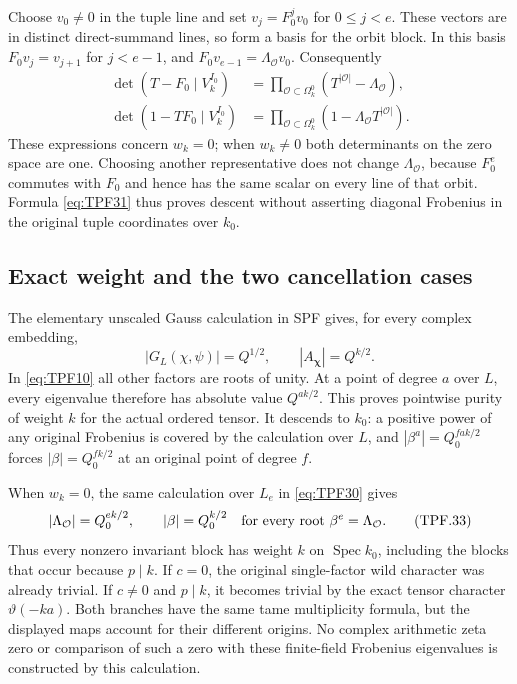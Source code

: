 Choose \(v_0\ne0\) in the tuple line and set
\(v_j=F_0^jv_0\) for \(0\le j<e\).
These vectors are in distinct direct-summand lines,
so form a basis for the orbit block. In this
basis \(F_0v_j=v_{j+1}\) for \(j<e-1\), and
\(F_0v_{e-1}=\Lambda_{\mathcal O}v_0\).
Consequently
\[
 \boxed{\begin{aligned}
 \det(T-F_0\mid V_k^{I_0})
    &=\prod_{\mathcal O\subset\Omega_k^0}
                              (T^{|\mathcal O|}-\Lambda_{\mathcal O}),\\
 \det(1-TF_0\mid V_k^{I_0})
    &=\prod_{\mathcal O\subset\Omega_k^0}
                              (1-\Lambda_{\mathcal O}T^{|\mathcal O|}).
 \end{aligned}}
 \tag{TPF.31}\label{eq:TPF31}
\]
These expressions concern \(w_k=0\); when \(w_k\ne0\)
both determinants on the zero space are one.
Choosing another representative does not change
\(\Lambda_{\mathcal O}\), because \(F_0^e\) commutes
with \(F_0\) and hence has the same scalar on every
line of that orbit. Formula \eqref{eq:TPF31} thus
proves descent without asserting diagonal
Frobenius in the original tuple coordinates over
\(k_0\).

\subsection{Exact weight and the two cancellation cases}

The elementary unscaled Gauss calculation in SPF
gives, for every complex embedding,
\[
 |G_L(\chi,\psi)|=Q^{1/2},\qquad
 |A_{\boldsymbol\chi}|=Q^{k/2}.
 \tag{TPF.32}\label{eq:TPF32}
\]
In \eqref{eq:TPF10} all other factors are roots of
unity. At a point of degree \(a\) over \(L\), every
eigenvalue therefore has absolute value \(Q^{ak/2}\).
This proves pointwise purity of weight \(k\) for
the actual ordered tensor. It descends to \(k_0\):
a positive power of any original Frobenius is
covered by the calculation over \(L\), and
\(|\beta^a|=Q_0^{fak/2}\) forces
\(|\beta|=Q_0^{fk/2}\) at an original point of
degree \(f\).

When \(w_k=0\), the same calculation over \(L_e\)
in \eqref{eq:TPF30} gives
\[
 |\Lambda_{\mathcal O}|=Q_0^{ek/2},\qquad
 |\beta|=Q_0^{k/2}
       \quad\hbox{for every root }\beta^e=\Lambda_{\mathcal O}.
 \tag{TPF.33}\label{eq:TPF33}
\]
Thus every nonzero invariant block has weight
\(k\) on \(\operatorname{Spec}k_0\), including the
blocks that occur because \(p\mid k\).
If \(c=0\), the original single-factor wild
character was already trivial. If \(c\ne0\) and
\(p\mid k\), it becomes trivial by the exact
tensor character \(\vartheta(-ka)\).
Both branches have the same tame multiplicity
formula, but the displayed maps account for
their different origins. No complex arithmetic
zeta zero or comparison of such a zero with these
finite-field Frobenius eigenvalues is constructed
by this calculation.

